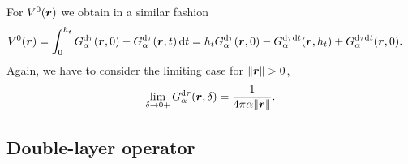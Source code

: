 \documentclass[a4paper,11pt]{article}
\begin{document}
For $V^0({{\bm{r}}})$ we obtain in a similar fashion
\begin{align*}
  V^0({{\bm{r}}}) &= \int_{0}^{h_t} G^{{\mathrm{d}} \tau}_\alpha({{\bm{r}}},0) - G^{{\mathrm{d}} \tau}_\alpha({{\bm{r}}}, t) \,{\mathrm{d}} t 
  =h_t G^{{\mathrm{d}}\tau}_\alpha({{\bm{r}}},0) - G^{{\mathrm{d}}\tau{\mathrm{d}} t}_\alpha({{\bm{r}}},h_t) + G^{{\mathrm{d}}\tau{\mathrm{d}} t}_\alpha({{\bm{r}}},0).
\end{align*}
Again, we have to consider the limiting case for $\|{{\bm{r}}}\| > 0$,
\begin{equation}
  \label{eq:G_dtau_lim_d}
  \lim_{\delta \to 0+} G^{{\mathrm{d}}\tau}_\alpha({{\bm{r}}},\delta) = \frac{1}{4\pi\alpha\|{{\bm{r}}}\|}.
\end{equation}

\subsection{Double-layer operator}
\end{document}
